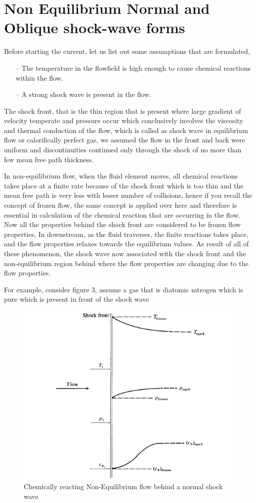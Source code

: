 \section{Non Equilibrium Normal and Oblique shock-wave forms}
Before starting the current, let us list out some assumptions that are formulated,
\begin{itemize}
\item[--] The temperature in the flowfield is high enough to cause chemical reactions within the flow.
\item[--] A strong shock wave is present in the flow.
\end{itemize}
The shock front, that is the thin region that is present where large gradient of velocity temperate and pressure occur which conclusively involves the viscosity and thermal conduction of the flow, which is called as shock wave in equilibrium flow or calorifically perfect gas, we assumed the flow in the front and back were uniform and discontinuities continued only through the shock of no more than few mean free path thickness.

In non-equilibrium flow, when the fluid element moves, all chemical reactions takes place at a finite rate because of the shock front which is too thin and the mean free path is very less with lesser number of collisions, hence if you recall the concept of frozen flow, the same concept is applied over here and therefore is essential in calculation of the chemical reaction that are occurring in the flow. Now all the properties behind the shock front are considered to be frozen flow properties. In downstream, as the fluid traverses, the finite reactions takes place, and the flow properties relaxes towards the equilibrium values. As result of all of these phenomenon, the shock wave now associated with the shock front and the non-equilibrium region behind where the flow properties are changing due to the flow properties.

For example, consider figure 3, assume a gas that is diatomic nitrogen which is pure which is present in front of the shock wave

\begin{figure}[ht]

\centering
  \includegraphics[width=0.7\linewidth]{images/schematic_n2.png}
  \caption{Chemically reacting Non-Equilibrium flow behind a normal shock wave}
  \label{fig:boat1}
\end{figure}

